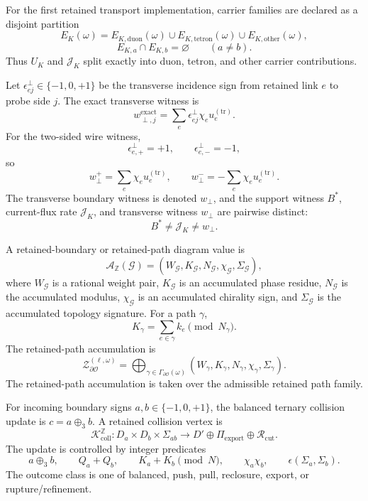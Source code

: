 \begin{definition}
\label{def:carrier-family-partition}
For the first retained transport implementation, carrier families are declared as a disjoint partition
\[
E_K(\omega)=E_{K,\mathrm{duon}}(\omega)\cup E_{K,\mathrm{tetron}}(\omega)\cup E_{K,\mathrm{other}}(\omega),
\]
\[
E_{K,a}\cap E_{K,b}=\varnothing\qquad(a\neq b).
\]
Thus \(U_K\) and \(\mathcal J_K\) split exactly into duon, tetron, and other carrier contributions.
\end{definition}

\begin{definition}
\label{def:transverse-boundary-witness}
Let \(\epsilon_{ej}^{\perp}\in\{-1,0,+1\}\) be the transverse incidence sign from retained link \(e\) to probe side \(j\). The exact transverse witness is
\[
w_{\perp,j}^{\mathrm{exact}}
=
\sum_e \epsilon_{ej}^{\perp}\chi_e u_e^{(\mathrm{tr})}.
\]
For the two-sided wire witness,
\[
\epsilon_{e,+}^{\perp}=+1,
\qquad
\epsilon_{e,-}^{\perp}=-1,
\]
so
\[
w_{\perp}^{+}=\sum_e\chi_eu_e^{(\mathrm{tr})},
\qquad
w_{\perp}^{-}=-\sum_e\chi_eu_e^{(\mathrm{tr})}.
\]
The transverse boundary witness is denoted \(w_{\perp}\), and the support witness \(B^*\), current-flux rate \(\mathcal J_K\), and transverse witness \(w_{\perp}\) are pairwise distinct:
\[
\boxed{B^*\neq\mathcal J_K\neq w_{\perp}}.
\]
\end{definition}

\begin{definition}
\label{def:integer-retained-boundary-diagram}
A retained-boundary or retained-path diagram value is
\[
\mathcal A_{\mathbb Z}(\mathcal G)
=(W_{\mathcal G},K_{\mathcal G},N_{\mathcal G},\chi_{\mathcal G},\Sigma_{\mathcal G}),
\]
where \(W_{\mathcal G}\) is a rational weight pair, \(K_{\mathcal G}\) is an accumulated phase residue, \(N_{\mathcal G}\) is the accumulated modulus, \(\chi_{\mathcal G}\) is an accumulated chirality sign, and \(\Sigma_{\mathcal G}\) is the accumulated topology signature. For a path \(\gamma\),
\[
K_{\gamma}=\sum_{e\in\gamma}k_e\pmod{N_{\gamma}}.
\]
The retained-path accumulation is
\[
\mathcal Z_{\partial\mathcal O}^{(\ell,\omega)}
=
\bigoplus_{\gamma\in\Gamma_{\partial\mathcal O}(\omega)}
(W_{\gamma},K_{\gamma},N_{\gamma},\chi_{\gamma},\Sigma_{\gamma}).
\]
The retained-path accumulation is taken over the admissible retained path family.
\end{definition}

\begin{definition}
\label{def:integer-collision-vertex}
For incoming boundary signs \(a,b\in\{-1,0,+1\}\), the balanced ternary collision update is \(c=a\oplus_3b\). A retained collision vertex is
\[
\mathcal K_{\mathrm{coll}}^{\mathbb Z}:
D_a\times D_b\times\Sigma_{ab}
\longrightarrow
D'\oplus\Pi_{\mathrm{export}}\oplus\mathcal R_{\mathrm{cut}}.
\]
The update is controlled by integer predicates
\[
a\oplus_3 b,
\qquad
Q_a+Q_b,
\qquad
K_a+K_b\pmod N,
\qquad
\chi_a\chi_b,
\qquad
\epsilon(\Sigma_a,\Sigma_b).
\]
The outcome class is one of balanced, push, pull, reclosure, export, or rupture/refinement.
\end{definition}

